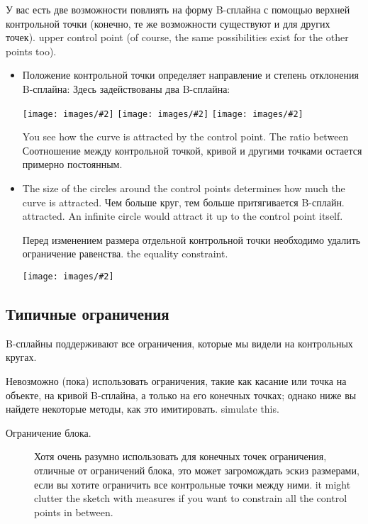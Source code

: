 \documentclass[12pt,titlepage]{article}
\newcommand{\img}[2]{\vspace{2ex}\noindent\texttt{[image: images/\#2]}}
\begin{document}
\begin {itemize}
У вас есть две возможности повлиять на форму B-сплайна с помощью верхней контрольной точки (конечно, те же возможности существуют и для других точек).
upper control point (of course, the same possibilities exist for the other
points too). 

\begin{itemize}
\item Положение контрольной точки определяет направление и степень отклонения B-сплайна:
      Здесь задействованы два B-сплайна:

{\newcommand{\scale}{0.54}
\hspace*{-0.8\leftmargini}\img{scale=\scale}{BSplineMoveUp}%
\hfill%
\img{scale=\scale}{BSplineMoveLeft}%
\hfill%
\img{scale=\scale}{BSplineMoveRight}}

You see how the curve is attracted by the control point. The ratio between
Соотношение между контрольной точкой, кривой и другими точками остается примерно постоянным.

\item The size of the circles around the control points determines how much
      the curve is attracted. Чем больше круг, тем больше притягивается B-сплайн.
      attracted. An infinite circle would attract it up to the
      control point itself.
      
      Перед изменением размера отдельной контрольной точки необходимо удалить ограничение равенства.
      the equality constraint.

\img{}{BSplineBigCircle}
\end{itemize}

\subsection*{Типичные ограничения}

B-сплайны поддерживают все ограничения, которые мы видели на контрольных кругах.

Невозможно (пока) использовать ограничения, такие как касание или точка на объекте, на кривой B-сплайна, а только на его конечных точках; однако ниже вы найдете некоторые методы, как это имитировать.
simulate this.

\begin{description}
\item [Ограничение блока.]
Хотя очень разумно использовать для конечных точек ограничения, отличные от ограничений блока, это может загромождать эскиз размерами, если вы хотите ограничить все контрольные точки между ними.
it might clutter the sketch with measures if you want to constrain all the
control points in between.


\end{description}
\end{itemize}
\end{document}
